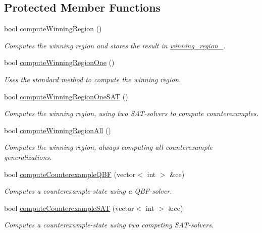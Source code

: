 \subsection*{Protected Member Functions}
\begin{DoxyCompactItemize}
\item 
bool \hyperlink{classLearnSynthQBF_ae8219ab3e4987775e1d6a006a9d38f4d}{compute\-Winning\-Region} ()
\begin{DoxyCompactList}\small\item\em Computes the winning region and stores the result in \hyperlink{classLearnSynthQBF_a9c6b41f7df5f4ed4bfc5930136fc1152}{winning\-\_\-region\-\_\-}. \end{DoxyCompactList}\item 
bool \hyperlink{classLearnSynthQBF_ac538cd53082bad1c8c45a7e178dfa4cb}{compute\-Winning\-Region\-One} ()
\begin{DoxyCompactList}\small\item\em Uses the standard method to compute the winning region. \end{DoxyCompactList}\item 
bool \hyperlink{classLearnSynthQBF_af8c897056a5018ff1717ea2d76f6cd8f}{compute\-Winning\-Region\-One\-S\-A\-T} ()
\begin{DoxyCompactList}\small\item\em Computes the winning region, using two S\-A\-T-\/solvers to compute counterexamples. \end{DoxyCompactList}\item 
bool \hyperlink{classLearnSynthQBF_a09a9ecb2b77c540cdcc327a35cd15c18}{compute\-Winning\-Region\-All} ()
\begin{DoxyCompactList}\small\item\em Computes the winning region, always computing all counterexample generalizations. \end{DoxyCompactList}\item 
bool \hyperlink{classLearnSynthQBF_a04b8dd6e26d646a6f197afb362168408}{compute\-Counterexample\-Q\-B\-F} (vector$<$ int $>$ \&ce)
\begin{DoxyCompactList}\small\item\em Computes a counterexample-\/state using a Q\-B\-F-\/solver. \end{DoxyCompactList}\item 
bool \hyperlink{classLearnSynthQBF_a3221800bf3f040b66b8a790bab4c82b5}{compute\-Counterexample\-S\-A\-T} (vector$<$ int $>$ \&ce)
\begin{DoxyCompactList}\small\item\em Computes a counterexample-\/state using two competing S\-A\-T-\/solvers. \end{DoxyCompactList}\item 

\end{DoxyCompactItemize}
